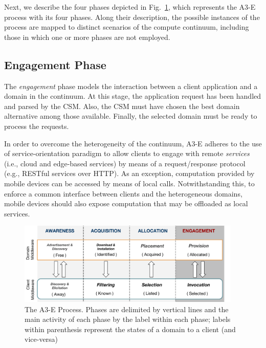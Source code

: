 
Next, we describe the four phases depicted in Fig.~\ref{fig:A3-E-process}, which represents the A3-E process with its four phases. Along their description, the possible instances of the process are mapped to distinct scenarios of the compute continuum, including those in which one or more phases are not employed.



\subsection{Engagement Phase}\label{sec:A3-E-engagement}

The \textit{engagement} phase models the interaction between a client application and a domain in the continuum. At this stage, the application request has been handled and parsed by the CSM. Also, the CSM must have chosen the best domain alternative among those available. Finally, the selected domain must be ready to process the requests.

In order to overcome the heterogeneity of the continuum, A3-E adheres to the use of service-orientation paradigm to allow clients to engage with remote \textit{services} (i.e., cloud and edge-based services) by means of a request/response protocol (e.g., RESTful services over HTTP). As an exception, computation provided by mobile devices can be accessed by means of local calls. Notwithstanding this, to enforce a common interface between clients and the heterogeneous domains, mobile devices should also expose computation that may be offloaded as local services. 

\begin{figure}[tbp]
	\includegraphics[width=0.95\textwidth]{figs/A3-E-process}
	\caption{The A3-E Process. Phases are delimited by vertical lines and the main activity of each phase by the label within each phase; labels within parenthesis represent the states of a domain to a client (and vice-versa)}
	\label{fig:A3-E-process}
\end{figure}

